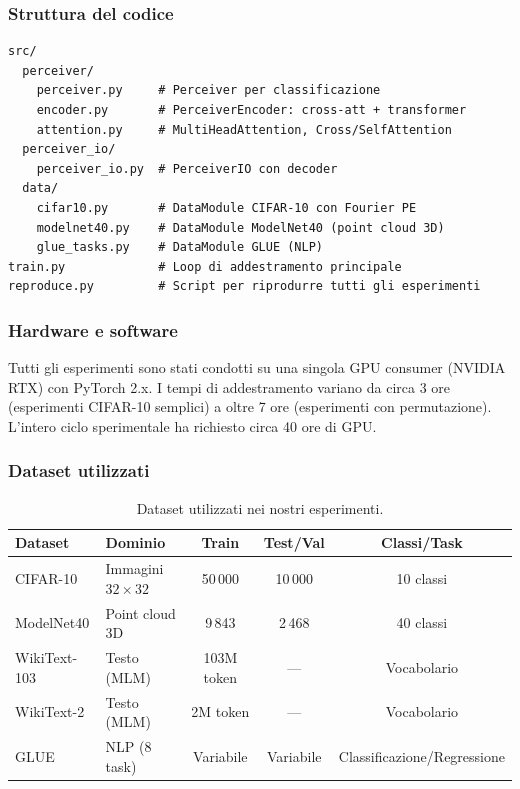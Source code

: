 \documentclass[12pt,a4paper]{article}
\begin{document}
\subsubsection{Struttura del codice}

\begin{formulabox}
\begin{verbatim}
src/
  perceiver/
    perceiver.py     # Perceiver per classificazione
    encoder.py       # PerceiverEncoder: cross-att + transformer
    attention.py     # MultiHeadAttention, Cross/SelfAttention
  perceiver_io/
    perceiver_io.py  # PerceiverIO con decoder
  data/
    cifar10.py       # DataModule CIFAR-10 con Fourier PE
    modelnet40.py    # DataModule ModelNet40 (point cloud 3D)
    glue_tasks.py    # DataModule GLUE (NLP)
train.py             # Loop di addestramento principale
reproduce.py         # Script per riprodurre tutti gli esperimenti
\end{verbatim}
\end{formulabox}

\subsubsection{Hardware e software}

Tutti gli esperimenti sono stati condotti su una singola GPU consumer (NVIDIA RTX) con PyTorch 2.x. I tempi di addestramento variano da circa 3 ore (esperimenti CIFAR-10 semplici) a oltre 7 ore (esperimenti con permutazione). L'intero ciclo sperimentale ha richiesto circa 40 ore di GPU.

\subsubsection{Dataset utilizzati}

\begin{table}[htbp]
\centering
\caption{Dataset utilizzati nei nostri esperimenti.}
\label{tab:dataset_nostri}
\begin{tabular}{@{}llccc@{}}
\toprule
\textbf{Dataset} & \textbf{Dominio} & \textbf{Train} & \textbf{Test/Val} & \textbf{Classi/Task} \\
\midrule
CIFAR-10 & Immagini $32 \times 32$ & 50\,000 & 10\,000 & 10 classi \\
ModelNet40 & Point cloud 3D & 9\,843 & 2\,468 & 40 classi \\
WikiText-103 & Testo (MLM) & 103M token & --- & Vocabolario \\
WikiText-2 & Testo (MLM) & 2M token & --- & Vocabolario \\
GLUE & NLP (8 task) & Variabile & Variabile & Classificazione/Regressione \\
\bottomrule
\end{tabular}
\end{table}
\end{document}
